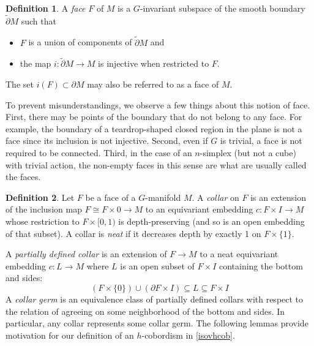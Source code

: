 \documentclass[11pt]{amsart}
\newtheorem{cor}{Corollary}[section]
\theoremstyle{definition}
\newtheorem{defn}{Definition}[section]
\numberwithin{equation}{section}
\numberwithin{figure}{section}
\newcommand{\R}{\mathbb R}
\newcommand{\ti}{\widetilde}
\newcommand{\tipartial}{\widetilde\partial}
\newcommand{\ourdefn}[1]{{\it #1}}
\begin{document}
\begin{defn}\label{df:face}
A \ourdefn{face} $F$ of $M$ is a $G$-invariant subspace of the smooth boundary $\tipartial M$ such that
\begin{itemize}
	\item $F$ is a union of components of $\tipartial M$ and
	\item the map $i\colon \tipartial M \to M$ is injective when restricted to $F$.
\end{itemize}
The set $i(F)\subset \partial M$ may also be referred to as a face of $M$.
\end{defn}

To prevent misunderstandings, we observe a few things about this notion of face. First, there may be points of the boundary that do not belong to any face. For example, the boundary of a teardrop-shaped closed region in the plane is not a face  since its inclusion is not injective. Second, even if $G$ is trivial, a face is not required to be connected. Third, in the case of an $n$-simplex (but not a cube) with trivial action, the non-empty faces in this sense are what are usually called the faces.





\begin{defn}\label{df:collar}
	Let $F$ be a face of a $G$-manifold $M$. A \ourdefn{collar} on $F$ is an extension of the inclusion map $F\cong F\times 0 \to M$ to an equivariant embedding $c\colon F \times I \to M$ whose restriction to $F \times [0,1)$ is depth-preserving (and so is an open embedding of that subset). A collar is \ourdefn{neat} if it decreases depth by exactly 1 on $F \times \{1\}$. 
\end{defn}

A \ourdefn{partially defined collar} is an extension of $F \to M$ to a neat equivariant embedding $ c:L\to M$ where $L$ is an open subset of $F \times I$ containing the bottom and sides:
	\[ (F \times \{0\}) \cup (\partial F \times I) \subseteq L \subseteq F \times I \]
A \ourdefn{collar germ} is an equivalence class of partially defined collars with respect to the relation of agreeing on some neighborhood of the bottom and sides. In particular, any collar represents some collar germ. The following lemmas provide motivation for our definition of an $h$-cobordism in \autoref{isovhcob}.
	
\end{document}
